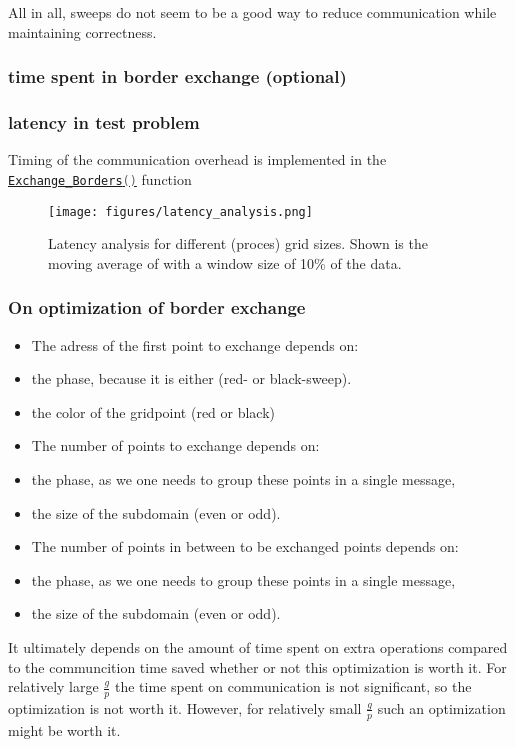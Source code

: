 All in all, sweeps do not seem to be a good way to reduce communication while maintaining correctness.

\subsubsection{time spent in border exchange (optional)} 

\subsubsection{latency in test problem}
Timing of the communication overhead is implemented in the 
\href{https://github.com/PhilipSoliman/hpc-labs/blob/b16da8d7ee717657e13c316369fa0996da7816cc/assignment_1/ppoisson2.c#L1088-L1134}{\lstinline[language=C]{Exchange_Borders()}} function
\begin{figure}[H]
    \centering
    \texttt{[image: figures/latency\_analysis.png]}
    \caption{Latency analysis for different (proces) grid sizes. Shown is the moving average of with a window size of 10\% of the data.}
    \label{fig:latency_analysis}
\end{figure}

\subsubsection{On optimization of border exchange}
\begin{itemize}
    \item The adress of the first point to exchange depends on:
    \setlength{\itemindent}{1em}
        \item the phase, because it is either (red- or black-sweep).
        \item the color of the gridpoint (red or black)
    \setlength{\itemindent}{0em}
    \item The number of points to exchange depends on:
    \setlength{\itemindent}{1em}
        \item the phase, as we one needs to group these points in a single message,
        \item the size of the subdomain (even or odd).
    \setlength{\itemindent}{0em}
    \item The number of points in between to be exchanged points depends on:
    \setlength{\itemindent}{1em}
        \item the phase, as we one needs to group these points in a single message,
        \item the size of the subdomain (even or odd).
\end{itemize}
It ultimately depends on the amount of time spent on extra operations compared to the communcition time saved whether or not this optimization is worth it.
For relatively large $\frac{g}{p}$ the time spent on communication is not significant, so the optimization is not worth it.
However, for relatively small $\frac{g}{p}$ such an optimization might be worth it.